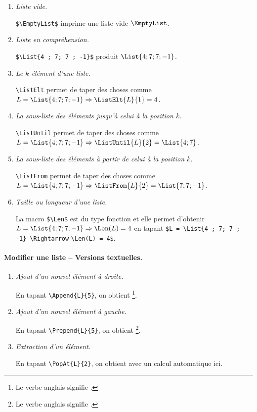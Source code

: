 \begin{enumerate}
	\item \textit{Liste vide.}

		  \verb+$\EmptyList$+ imprime une liste vide $\EmptyList$.


	\item \textit{Liste en compréhension.}

		  \verb+$\List{4 ; 7; 7 ; -1}$+ produit $\List{4 ; 7; 7 ; -1}$.


	\item \textit{Le $k$\ieme{} élément d'une liste.}

		  \verb+\ListElt+ permet de taper des choses comme $L = \List{4 ; 7; 7 ; -1} \Rightarrow \ListElt{L}{1} = 4$.


	\item \textit{La sous-liste des éléments jusqu'à celui à la position $k$.}

		  \verb+\ListUntil+ permet de taper des choses comme $L = \List{4 ; 7; 7 ; -1} \Rightarrow \ListUntil{L}{2} = \List{4 ; 7}$.


	\item \textit{La sous-liste des éléments à partir de celui à la position $k$.}

		  \verb+\ListFrom+ permet de taper des choses comme $L = \List{4 ; 7; 7 ; -1} \Rightarrow \ListFrom{L}{2} = \List{7 ; 7 ; -1}$.


	\item \textit{Taille ou longueur d'une liste.}

		  La macro \verb+$\Len$+ est du type fonction et elle permet d'obtenir $L = \List{4 ; 7; 7 ; -1} \Rightarrow \Len(L) = 4$ en tapant \verb+$L = \List{4 ; 7; 7 ; -1} \Rightarrow+ \verb+\Len(L) = 4$+.
\end{enumerate}



\paragraph{Modifier une liste -- Versions textuelles.}\phantom{XX}\smallskip

\begin{enumerate}
	\item \textit{Ajout d'un nouvel élément à droite.}

	      En tapant \verb+\Append{L}{5}+, on obtient 
	      \footnote{
		       Le verbe anglais  signifie .
		  }.


	\item \textit{Ajout d'un nouvel élément à gauche.}

	      En tapant \verb+\Prepend{L}{5}+, on obtient 
	      \footnote{
		       Le verbe anglais  signifie .
		  }.


	\item \textit{Extraction d'un élément.}

	      En tapant \verb+\PopAt{L}{2}+, on obtient  avec un calcul automatique ici.
\end{enumerate}



